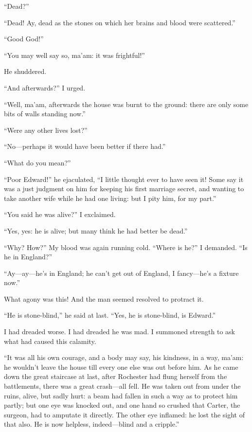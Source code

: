 \enquote{Dead?}

\enquote{Dead! Ay, dead as the stones on which her brains and blood
were scattered.}

\enquote{Good God!}

\enquote{You may well say so, ma'am: it was frightful!}

He shuddered.

\enquote{And afterwards?} I urged.

\enquote{Well, ma'am, afterwards the house was burnt to the ground:
there are only some bits of walls standing now.}

\enquote{Were any other lives lost?}

\enquote{No---perhaps it would have been better if there had.}

\enquote{What do you mean?}

\enquote{Poor \Mr{} Edward!} he ejaculated, \enquote{I little thought ever
to have seen it! Some say it was a just judgment on him for keeping his
first marriage secret, and wanting to take another wife while he had one
living: but I pity him, for my part.}

\enquote{You said he was alive?} I exclaimed.

\enquote{Yes, yes: he is alive; but many think he had better be dead.}

\enquote{Why? How?} My blood was again running cold. \enquote{Where
is he?} I demanded. \enquote{Is he in England?}

\enquote{Ay---ay---he's in England; he can't get out of England, I
fancy---he's a fixture now.}

What agony was this! And the man seemed resolved to protract it.

\enquote{He is stone-blind,} he said at last. \enquote{Yes, he is
stone-blind, is \Mr{} Edward.}

I had dreaded worse. I had dreaded he was mad. I summoned strength to
ask what had caused this calamity.

\enquote{It was all his own courage, and a body may say, his kindness,
in a way, ma'am: he wouldn't leave the house till every one else was out
before him. As he came down the great staircase at last, after \Mrs{}
 Rochester had flung herself from the battlements, there was a great
crash---all fell. He was taken out from under the ruins, alive, but
sadly hurt: a beam had fallen in such a way as to protect him partly;
but one eye was knocked out, and one hand so crushed that \Mr{} Carter,
the surgeon, had to amputate it directly. The other eye inflamed: he
lost the sight of that also. He is now helpless, indeed---blind and a
cripple.}

